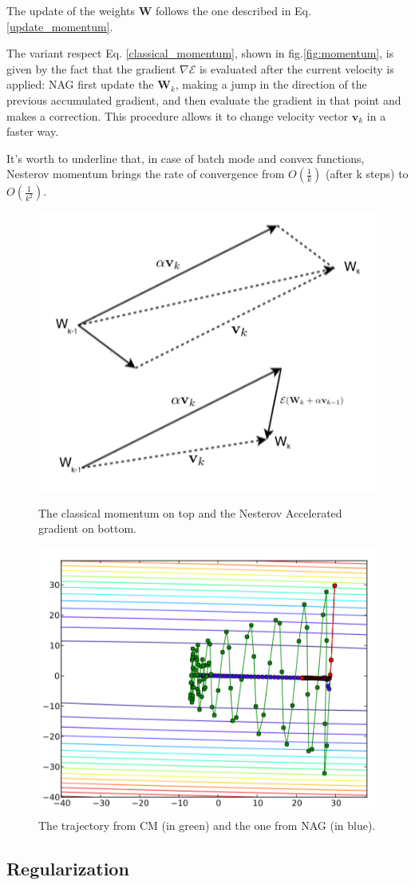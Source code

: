 			The update of the weights \textbf{W} follows the one described in Eq. \ref{update_momentum}.

			The variant respect Eq. \ref{classical_momentum}, shown in fig.\ref{fig:momentum}, is given by the fact that the gradient $\nabla\mathcal{E}$ is evaluated after the current velocity is applied: NAG first update the $\textbf{W}_k$, making a jump in the direction of the previous accumulated gradient, and then evaluate the gradient in that point and makes a correction. This procedure allows it to change velocity vector $\textbf{v}_{k}$ in a faster way.

			It's worth to underline that, in case of batch mode and convex functions, Nesterov momentum brings the rate of convergence from $O(\frac{1}{k})$ (after k steps) to $O(\frac{1}{k^2})$. %
			\begin{figure}
			\centering
			  \includegraphics[width=.4\linewidth, scale=0.5]{img/figures/momentum}
			  \caption{The classical momentum on top and the Nesterov Accelerated gradient on bottom.}
			  \label{fig:momentum}

			  \includegraphics[width=.4\linewidth, scale=0.5]{img/figures/momentum_graph}
			  \caption{The trajectory from CM (in green) and the one from NAG (in blue).}
			  \label{fig:momentum_graph}
			\end{figure}


		\subsection{Regularization} %
		\label{sec:regularization}

